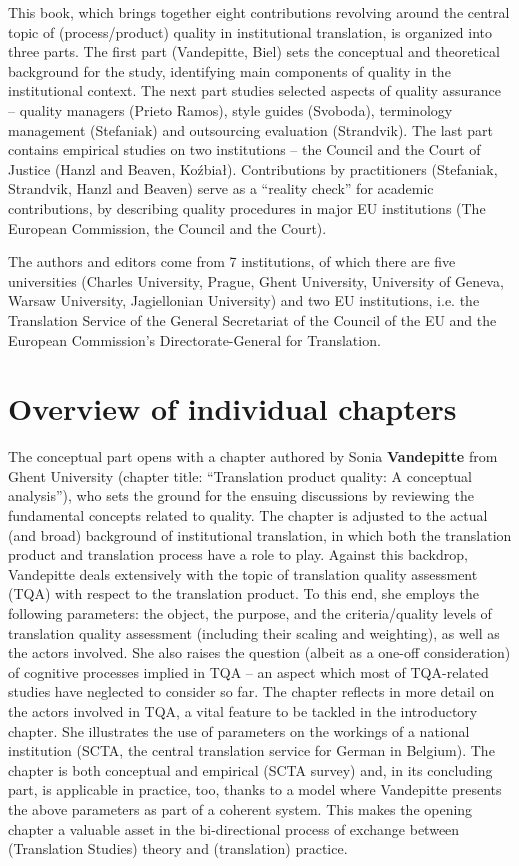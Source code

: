 \documentclass[output=paper]{langsci/langscibook}
\begin{document}
This book, which brings together eight contributions revolving around the central topic of (process/product) quality in institutional translation, is organized into three parts. The first part (Vandepitte, Biel) sets the conceptual and theoretical background for the study, identifying main components of quality in the institutional context. The next part studies selected aspects of quality assurance – quality managers (Prieto Ramos), style guides (Svoboda), terminology management (Stefaniak) and outsourcing evaluation (Strandvik). The last part contains empirical studies on two institutions – the Council and the Court of Justice (Hanzl and Beaven, Koźbiał). Contributions by practitioners (Stefaniak, Strandvik, Hanzl and Beaven) serve as a “reality check” for academic contributions, by describing quality procedures in major EU institutions (The European Commission, the Council and the Court). 

The authors and editors come from 7 institutions, of which there are five universities (Charles University, Prague, Ghent University, University of Geneva, Warsaw University, Jagiellonian University) and two EU institutions, i.e. the Translation Service of the General Secretariat of the Council of the EU and the European Commission’s Directorate-General for Translation.

\section{Overview of individual chapters}
\largerpage
The conceptual part opens with a chapter authored by Sonia \textbf{Vandepitte} from Ghent University (chapter title: “Translation product quality: A conceptual analysis”), who sets the ground for the ensuing discussions by reviewing the fundamental concepts related to quality. The chapter is adjusted to the actual (and broad) background of institutional translation, in which both the translation product and translation process have a role to play. Against this backdrop, Vandepitte deals extensively with the topic of translation quality assessment (TQA) with respect to the translation product. To this end, she employs the following parameters: the object, the purpose, and the criteria/quality levels of translation quality assessment (including their scaling and weighting), as well as the actors involved. She also raises the question (albeit as a one-off consideration) of cognitive processes implied in TQA – an aspect which most of TQA-related studies have neglected to consider so far. The chapter reflects in more detail on the actors involved in TQA, a vital feature to be tackled in the introductory chapter. She illustrates the use of parameters on the workings of a national institution (SCTA, the central translation service for German in Belgium). The chapter is both conceptual and empirical (SCTA survey) and, in its concluding part, is applicable in practice, too, thanks to a model where Vandepitte presents the above parameters as part of a coherent system. This makes the opening chapter a valuable asset in the bi-directional process of exchange between (Translation Studies) theory and (translation) practice.
\end{document}

